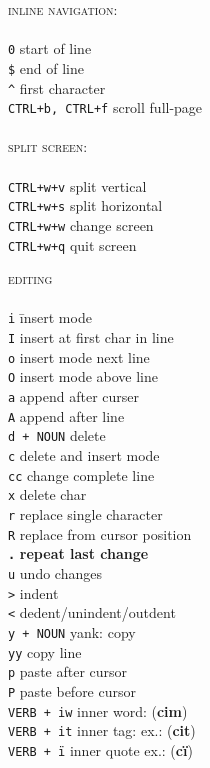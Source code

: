\documentclass[a4paper,10pt]{scrartcl}
\begin{document}
\begin{multicols}{2}
\begin{tabbing}
\large{\textsc{inline navigation:}}\\\\
\texttt{0}					\> start of line\\
\texttt{\$}					\> end of line \\
\texttt{\^}					\> first character\\
\texttt{CTRL+b, CTRL+f}		\> scroll full-page\\\\

\large{\textsc{split screen:}}\\\\
\texttt{CTRL+w+v}	\> split vertical\\
\texttt{CTRL+w+s}	\> split horizontal\\
\texttt{CTRL+w+w}	\> change screen\\
\texttt{CTRL+w+q}	\> quit screen\\
\end{tabbing}

\begin{tabbing}
\large{\textsc{editing}}\\\\
\texttt{i}				\hspace{2cm}\= insert mode\\
\texttt{I}				\> insert at first char in line\\
\texttt{o}				\> insert mode next line\\
\texttt{O}				\> insert mode above line\\
\texttt{a}				\> append after curser\\
\texttt{A}				\> append after line\\
\texttt{d + NOUN}		\> delete\\
\texttt{c}				\> delete and insert mode \\
\texttt{cc}				\> change complete line \\
\texttt{x}				\> delete char\\
\texttt{r}				\> replace single character\\
\texttt{R}				\> replace from cursor position\\
\texttt{\textbf{.}}		\> \textbf{repeat last change}\\
\texttt{u}				\> undo changes\\
\texttt{>}				\> indent\\
\texttt{<}				\> dedent/unindent/outdent\\
\texttt{y + NOUN}		\> yank: copy\\
\texttt{yy}				\> copy line\\
\texttt{p}				\> paste after cursor\\
\texttt{P}				\> paste before cursor\\
\texttt{VERB + iw}		\> inner word: (\textbf{cim})\\
\texttt{VERB + it}		\> inner tag: ex.: (\textbf{cit})\\
\texttt{VERB + i\"}		\> inner quote ex.: (\textbf{ci\"})\\




\end{tabbing}
\end{multicols}
\end{document}
